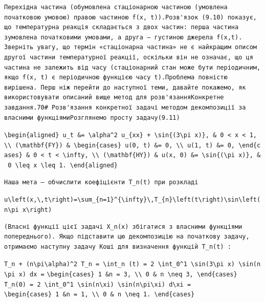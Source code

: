 \documentclass[
  ukrainian,
]{article}
\begin{document}
\begin{verbatim}
Перехідна частина (обумовлена стаціонарною частиною (умовлена початковою умовою) правою частиною f(x, t)).Розв'язок (9.10) показує, що температурна реакція складається з двох частин: перша частина зумовлена початковими умовами, а друга — густиною джерела f(x,t). Зверніть увагу, що термін «стаціонарна частина» не є найкращим описом другої частини температурної реакції, оскільки він не означає, що ця частина не залежить від часу (стаціонарний стан може бути періодичним, якщо f(x, t) є періодичною функцією часу t).Проблема повністю вирішена. Перш ніж перейти до наступної теми, давайте покажемо, як використовувати описаний вище метод для розв'язанняКонкретне завдання.70# Розв'язання конкретної задачі методом декомпозиції за власними функціямиРозглянемо просту задачу(9.11)
\end{verbatim}

\texttt{\textbackslash{}begin\{aligned\}\ u\_t\ \&=\ \textbackslash{}alpha\^{}2\ u\_\{xx\}\ +\ \textbackslash{}sin\{(3\textbackslash{}pi\ x)\},\ \&\ 0\ \textless{}\ x\ \textless{}\ 1,\ \textbackslash{}\textbackslash{}\ (\textbackslash{}mathbf\{FY\})\ \&\ \textbackslash{}begin\{cases\}\ u(0,\ t)\ \&=\ 0,\ \textbackslash{}\textbackslash{}\ u(1,\ t)\ \&=\ 0,\ \textbackslash{}end\{cases\}\ \&\ 0\ \textless{}\ t\ \textless{}\ \textbackslash{}infty,\ \textbackslash{}\textbackslash{}\ (\textbackslash{}mathbf\{HY\})\ \&\ u(x,\ 0)\ \&=\ \textbackslash{}sin\{(\textbackslash{}pi\ x)\},\ \&\ 0\ \textbackslash{}leq\ x\ \textbackslash{}leq\ 1.\ \textbackslash{}end\{aligned\}}

\begin{verbatim}
Наша мета — обчислити коефіцієнти T_n(t) при розкладі
\end{verbatim}

\texttt{u\textbackslash{}left(x,\textbackslash{},t\textbackslash{}right)=\textbackslash{}sum\_\{n=1\}\^{}\{\textbackslash{}infty\}\textbackslash{},T\_\{n\}\textbackslash{}left(t\textbackslash{}right)\textbackslash{}sin\textbackslash{}left(n\textbackslash{}pi\ x\textbackslash{}right)}

\begin{verbatim}
(Власні функції цієї задачі X_n(x) збігатися з власними функціями попереднього). Якщо підставити цю декомпозицію на початкову задачу, отримаємо наступну задачу Коші для визначення функцій T_n(t) :
\end{verbatim}

\texttt{T\_n\ +\ (n\textbackslash{}pi\textbackslash{}alpha)\^{}2\ T\_n\ =\ \textbackslash{}int\_n\ (t)\ =\ 2\ \textbackslash{}int\_0\^{}1\ \textbackslash{}sin(3\textbackslash{}pi\ x)\ \textbackslash{}sin(n\textbackslash{}pi\ x)\ dx\ =}
\texttt{\textbackslash{}begin\{cases\}\ 1\ \&n\ =\ 3,\ \textbackslash{}\textbackslash{}\ 0\ \&\ n\ \textbackslash{}neq\ 3,\ \textbackslash{}end\{cases\}}
\texttt{T\_n(0)\ =\ 2\ \textbackslash{}int\_0\^{}1\ \textbackslash{}sin(n\textbackslash{}xi)\ \textbackslash{}sin(n\textbackslash{}pi\textbackslash{}xi)\ d\textbackslash{}xi\ =}
\texttt{\textbackslash{}begin\{cases\}\ 1\ \&n\ =\ 1,\ \textbackslash{}\textbackslash{}\ 0\ \&\ n\ \textbackslash{}neq\ 1.\ \textbackslash{}end\{cases\}}
\end{document}
